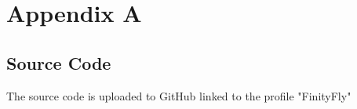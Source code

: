 
\chapter{Appendix A} %

\label{AppendixA} %

\section{Source Code}

The source code is uploaded to GitHub linked to the profile "FinityFly"